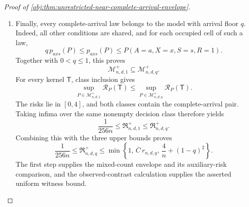 \documentclass[11pt]{article}
\begin{document}
\begin{proof}[Proof of \cref{obj:thm:unrestricted-near-complete-arrival-envelope}]
\begin{enumerate}
\[\begin{aligned}
\max_{\iota\in\{0,1\}}
Q_{\mathrm{test},\iota}^{(n)}(\mathcal E_{\mathrm{test},\iota})\\
&=
\max_{\iota\in\{0,1\}}
\left\{
\left(\frac{\delta_{\mathrm{gap}}}{2}\right)^2
Q_{\mathrm{test},\iota}^{(n)}(\mathcal E_{\mathrm{test},\iota})
\right\}\\
&\le
\max_{\iota\in\{0,1\}}
E_{P_{\mathrm{test},\iota}}\!\left[
\left(b_{\mathsf T}(\mathbf O_n)-\tau(P_{\mathrm{test},\iota})\right)^2
\right]\\
&\le
\max_{\iota\in\{0,1\}}
\mathcal R_{P_{\mathrm{test},\iota}}(\mathsf T).
\end{aligned}
\]
For every bounded kernel and every full-data law, bounded actions and
\(\tau(P)\in[-1,1]\) also give
\[
0\le\mathcal R_P(\mathsf T)\le4.
\]
Thus the worst-case risks are finite. The decision class is nonempty because it contains the zero estimator, and the complete-arrival class contains the constructed pair. Taking the supremum over that class and then the infimum over kernels gives
\[
\mathfrak R^{+}_{n,d,1}
\ge
\frac{\delta_{\mathrm{gap}}^2}{16}
=
\frac1{256n}.
\]

\item Finally, every complete-arrival law belongs to the model with arrival floor \(q\). Indeed, all other conditions are shared, and for each occupied cell of such a law,
\[
q\,p_{axs}(P)
\le p_{axs}(P)
\le P(A=a,X=x,S=s,R=1).
\]
Together with \(0<q\le1\), this proves
\[
\mathcal M^{+}_{n,d,1}\subseteq\mathcal M^{+}_{n,d,q}.
\]
For every kernel \(\mathsf T\), class inclusion gives
\[
\sup_{P\in\mathcal M^{+}_{n,d,1}}\mathcal R_P(\mathsf T)
\le
\sup_{P\in\mathcal M^{+}_{n,d,q}}\mathcal R_P(\mathsf T).
\]
The risks lie in \([0,4]\), and both classes contain the complete-arrival pair. Taking infima over the same nonempty decision class therefore yields
\[
\frac1{256n}
\le
\mathfrak R^{+}_{n,d,1}
\le
\mathfrak R^{+}_{n,d,q}.
\]
Combining this with the three upper bounds proves
\[
\frac1{256n}
\le
\mathfrak R^{+}_{n,d,q}
\le
\min\left\{
1,\,
\overline C\,r_{n,d,q},\,
\frac4n+(1-q)^2
\right\}.
\]
The first step supplies the mixed-count envelope and its auxiliary-risk comparison, and the observed-contrast calculation supplies the asserted uniform witness bound.
\end{enumerate}
\end{proof}
\end{document}
